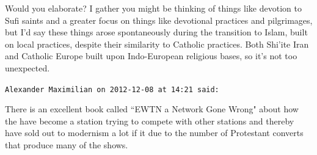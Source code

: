 \begin{footnotesize}
\begin{sffamily}
Would you elaborate? I gather you might be thinking of things like devotion to Sufi saints and a greater focus on things like devotional practices and pilgrimages, but I'd say these things arose spontaneously during the transition to Islam, built on local practices, despite their similarity to Catholic practices. Both Shi'ite Iran and Catholic Europe built upon Indo-European religious bases, so it's not too unexpected.


\hfill

\texttt{Alexander Maximilian on 2012-12-08 at 14:21 said: }

There is an excellent book called ``EWTN a Network Gone Wrong" about how the have become a station trying to compete with other stations and thereby have sold out to modernism a lot if it due to the number of Protestant converts that produce many of the shows.


\end{sffamily}\end{footnotesize}
